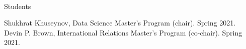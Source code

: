 \documentclass[12pt]{article}
\begin{document}
\vspace{.75cm}

\\
\vspace{.2cm}


\begin{minipage}[t]{.3\textwidth}
Students\\
\end{minipage}
\begin{minipage}[t]{.65\textwidth}
\FlushLeft
Shukhrat Khuseynov, Data Science Master's Program (chair). Spring 2021.\\
\vspace{.5cm}
Devin P. Brown, International Relations Master's Program (co-chair). Spring 2021.
\end{minipage}

\vspace{.5cm}
\end{document}
